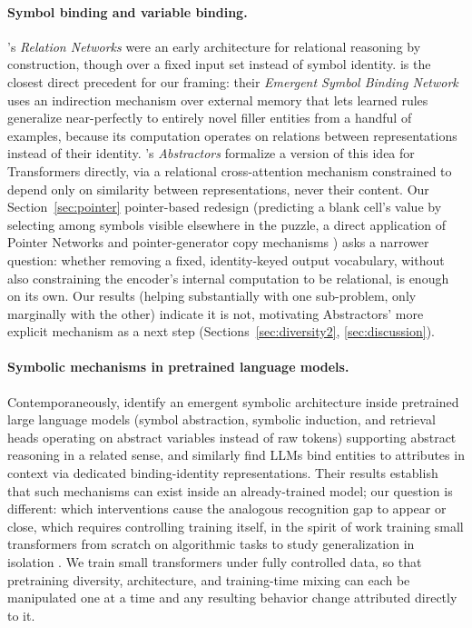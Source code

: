 \documentclass{article} %
\begin{document}
\paragraph{Symbol binding and variable binding.}
\citet{santoro2017simple}'s \emph{Relation Networks} were an early
architecture for relational reasoning by construction, though over a
fixed input set instead of symbol identity. \citet{webb2021emergent} is
the closest direct precedent for our framing: their \emph{Emergent
Symbol Binding Network} uses an indirection mechanism over external memory
that lets learned rules generalize near-perfectly to entirely novel filler
entities from a handful of examples, because its computation operates on
relations between representations instead of their identity.
\citet{altabaa2024abstractors}'s \emph{Abstractors} formalize a version of
this idea for Transformers directly, via a relational cross-attention
mechanism constrained to depend only on similarity between
representations, never their content. Our Section~\ref{sec:pointer}
pointer-based redesign (predicting a blank cell's value by selecting
among symbols visible elsewhere in the puzzle, a direct application of
Pointer Networks \citep{vinyals2015pointer} and pointer-generator copy
mechanisms \citep{see2017get}) asks a narrower question: whether
removing a fixed, identity-keyed output vocabulary, without also
constraining the encoder's internal computation to be relational, is
enough on its own. Our results (helping substantially with one
sub-problem, only marginally with the other) indicate it is not,
motivating Abstractors' more explicit mechanism as a next step
(Sections~\ref{sec:diversity2}, \ref{sec:discussion}).

\paragraph{Symbolic mechanisms in pretrained language models.}
Contemporaneously, \citet{yang2025emergent} identify an emergent symbolic
architecture inside pretrained large language models (symbol
abstraction, symbolic induction, and retrieval heads operating on
abstract variables instead of raw tokens) supporting abstract reasoning
in a related sense, and \citet{feng2024how} similarly find LLMs bind
entities to attributes in context via dedicated binding-identity
representations. Their results establish that such mechanisms can exist inside an
already-trained model; our question is different: which interventions
cause the analogous recognition gap to appear or close, which requires
controlling training itself, in the spirit of work training small
transformers from scratch on algorithmic tasks to study generalization
in isolation \citep{power2022grokking,velickovic2021neural}. We train
small transformers under fully controlled data, so that pretraining
diversity, architecture, and training-time mixing can each be
manipulated one at a time and any resulting behavior change attributed
directly to it.
\end{document}
